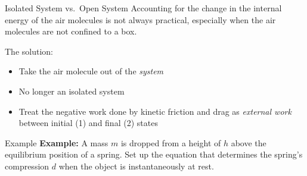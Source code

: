 \documentclass[12pt,compress,aspectratio=169]{beamer}
\begin{document}
\begin{frame}{Isolated System vs.\ Open System}
  Accounting for the change in the internal energy of the air molecules is not
  always practical, especially when the air molecules are not confined to a box.
  \begin{center}
  \end{center}
  The solution:
  \begin{itemize}
  \item Take the air molecule out of the \emph{system}
  \item No longer an isolated system
  \item Treat the negative work done by kinetic friction and drag as
    \emph{external work} between initial (1) and final (2) states

  \end{itemize}
\end{frame}

%
%  
%    



\begin{frame}{Example}
  \textbf{Example:} A mass $m$ is dropped from a height of $h$ above the
  equilibrium position of a spring. Set up the equation that determines the
  spring's compression $d$ when the object is instantaneously at rest.
  \begin{center}
  \end{center}
\end{frame}
\end{document}
